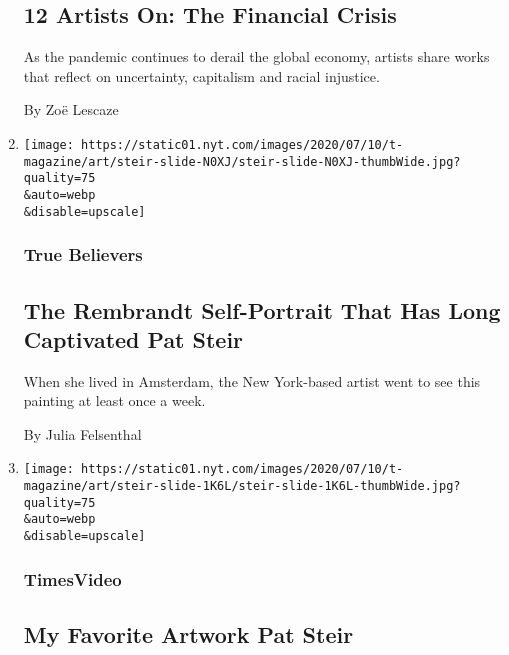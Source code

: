\begin{enumerate}
  \hypertarget{12-artists-on-the-financial-crisis}{%
  \subsection{12 Artists On: The Financial
  Crisis}\label{12-artists-on-the-financial-crisis}}

  As the pandemic continues to derail the global economy, artists share
  works that reflect on uncertainty, capitalism and racial injustice.

  By Zoë Lescaze
\item
  \href{/2020/07/21/t-magazine/pat-steir.html}{}

  \texttt{[image: https://static01.nyt.com/images/2020/07/10/t-magazine/art/steir-slide-N0XJ/steir-slide-N0XJ-thumbWide.jpg?quality=75\\\&auto=webp\\\&disable=upscale]}

  \hypertarget{true-believers-8}{%
  \subsubsection{True Believers}\label{true-believers-8}}

  \hypertarget{the-rembrandt-self-portrait-that-has-long-captivated-pat-steir}{%
  \subsection{The Rembrandt Self-Portrait That Has Long Captivated Pat
  Steir}\label{the-rembrandt-self-portrait-that-has-long-captivated-pat-steir}}

  When she lived in Amsterdam, the New York-based artist went to see
  this painting at least once a week.

  By Julia Felsenthal
\item
  \href{/video/t-magazine/art/100000007194871/my-favorite-artwork-pat-steir.html}{}

  \texttt{[image: https://static01.nyt.com/images/2020/07/10/t-magazine/art/steir-slide-1K6L/steir-slide-1K6L-thumbWide.jpg?quality=75\\\&auto=webp\\\&disable=upscale]}

  \hypertarget{timesvideo}{%
  \subsubsection{TimesVideo}\label{timesvideo}}

  \hypertarget{my-favorite-artwork--pat-steir}{%
  \subsection{My Favorite Artwork \textbar{} Pat
  Steir}\label{my-favorite-artwork--pat-steir}}


\end{enumerate}
